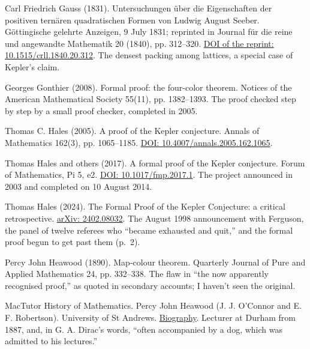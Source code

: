 \noindent Carl Friedrich Gauss (1831). Untersuchungen \"uber die Eigenschaften der positiven tern\"aren quadratischen Formen von Ludwig August Seeber. G\"ottingische gelehrte Anzeigen, 9 July 1831; reprinted in Journal f\"ur die reine und angewandte Mathematik 20 (1840), pp. 312--320. \href{https://doi.org/10.1515/crll.1840.20.312}{DOI of the reprint: 10.1515/crll.1840.20.312}. The densest packing among lattices, a special case of Kepler's claim.
\par\medskip

\noindent Georges Gonthier (2008). Formal proof: the four-color theorem. Notices of the American Mathematical Society 55(11), pp. 1382--1393. The proof checked step by step by a small proof checker, completed in 2005.
\par\medskip

\noindent Thomas C. Hales (2005). A proof of the Kepler conjecture. Annals of Mathematics 162(3), pp. 1065--1185. \href{https://doi.org/10.4007/annals.2005.162.1065}{DOI: 10.4007/annals.2005.162.1065}.
\par\medskip

\noindent Thomas Hales and others (2017). A formal proof of the Kepler conjecture. Forum of Mathematics, Pi 5, e2. \href{https://doi.org/10.1017/fmp.2017.1}{DOI: 10.1017/fmp.2017.1}. The project announced in 2003 and completed on 10 August 2014.
\par\medskip

\noindent Thomas Hales (2024). The Formal Proof of the Kepler Conjecture: a critical retrospective. \href{https://arxiv.org/abs/2402.08032}{arXiv: 2402.08032}. The August 1998 announcement with Ferguson, the panel of twelve referees who ``became exhausted and quit,'' and the formal proof begun to get past them (p.~2).
\par\medskip

\noindent Percy John Heawood (1890). Map-colour theorem. Quarterly Journal of Pure and Applied Mathematics 24, pp. 332--338. The flaw in ``the now apparently recognised proof,'' as quoted in secondary accounts; I haven't seen the original.
\par\medskip

\noindent MacTutor History of Mathematics. Percy John Heawood (J. J. O'Connor and E. F. Robertson). University of St Andrews. \href{https://mathshistory.st-andrews.ac.uk/Biographies/Heawood/}{Biography}. Lecturer at Durham from 1887, and, in G. A. Dirac's words, ``often accompanied by a dog, which was admitted to his lectures.''
\par\medskip


